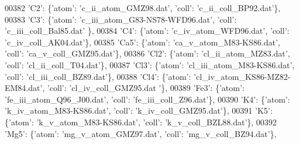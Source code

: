 \begin{DoxyCode}
00382                              \textcolor{stringliteral}{'C2'}: \{\textcolor{stringliteral}{'atom'}: \textcolor{stringliteral}{'c\_ii\_atom\_GMZ98.dat'}, \textcolor{stringliteral}{'coll'}: \textcolor{stringliteral}{'c\_ii\_coll\_BP92.dat'}\},
00383                              \textcolor{stringliteral}{'C3'}: \{\textcolor{stringliteral}{'atom'}: \textcolor{stringliteral}{'c\_iii\_atom\_G83-NS78-WFD96.dat'}, \textcolor{stringliteral}{'coll'}: \textcolor{stringliteral}{'c\_iii\_coll\_Bal85.dat'}
      \},
00384                              \textcolor{stringliteral}{'C4'}: \{\textcolor{stringliteral}{'atom'}: \textcolor{stringliteral}{'c\_iv\_atom\_WFD96.dat'}, \textcolor{stringliteral}{'coll'}: \textcolor{stringliteral}{'c\_iv\_coll\_AK04.dat'}\},
00385                              \textcolor{stringliteral}{'Ca5'}: \{\textcolor{stringliteral}{'atom'}: \textcolor{stringliteral}{'ca\_v\_atom\_M83-KS86.dat'}, \textcolor{stringliteral}{'coll'}: \textcolor{stringliteral}{'ca\_v\_coll\_GMZ95.dat'}\},
00386                              \textcolor{stringliteral}{'Cl2'}: \{\textcolor{stringliteral}{'atom'}: \textcolor{stringliteral}{'cl\_ii\_atom\_MZ83.dat'}, \textcolor{stringliteral}{'coll'}: \textcolor{stringliteral}{'cl\_ii\_coll\_T04.dat'}\},
00387                              \textcolor{stringliteral}{'Cl3'}: \{\textcolor{stringliteral}{'atom'}: \textcolor{stringliteral}{'cl\_iii\_atom\_M83-KS86.dat'}, \textcolor{stringliteral}{'coll'}: \textcolor{stringliteral}{'cl\_iii\_coll\_BZ89.dat'}\},
00388                              \textcolor{stringliteral}{'Cl4'}: \{\textcolor{stringliteral}{'atom'}: \textcolor{stringliteral}{'cl\_iv\_atom\_KS86-MZ82-EM84.dat'}, \textcolor{stringliteral}{'coll'}: \textcolor{stringliteral}{'cl\_iv\_coll\_GMZ95.dat
      '}\},
00389                              \textcolor{stringliteral}{'Fe3'}: \{\textcolor{stringliteral}{'atom'}: \textcolor{stringliteral}{'fe\_iii\_atom\_Q96\_J00.dat'}, \textcolor{stringliteral}{'coll'}: \textcolor{stringliteral}{'fe\_iii\_coll\_Z96.dat'}\},
00390                              \textcolor{stringliteral}{'K4'}: \{\textcolor{stringliteral}{'atom'}: \textcolor{stringliteral}{'k\_iv\_atom\_M83-KS86.dat'}, \textcolor{stringliteral}{'coll'}: \textcolor{stringliteral}{'k\_iv\_coll\_GMZ95.dat'}\},
00391                              \textcolor{stringliteral}{'K5'}: \{\textcolor{stringliteral}{'atom'}: \textcolor{stringliteral}{'k\_v\_atom\_M83-KS86.dat'}, \textcolor{stringliteral}{'coll'}: \textcolor{stringliteral}{'k\_v\_coll\_BZL88.dat'}\},
00392                              \textcolor{stringliteral}{'Mg5'}: \{\textcolor{stringliteral}{'atom'}: \textcolor{stringliteral}{'mg\_v\_atom\_GMZ97.dat'}, \textcolor{stringliteral}{'coll'}: \textcolor{stringliteral}{'mg\_v\_coll\_BZ94.dat'}\},

\end{DoxyCode}
